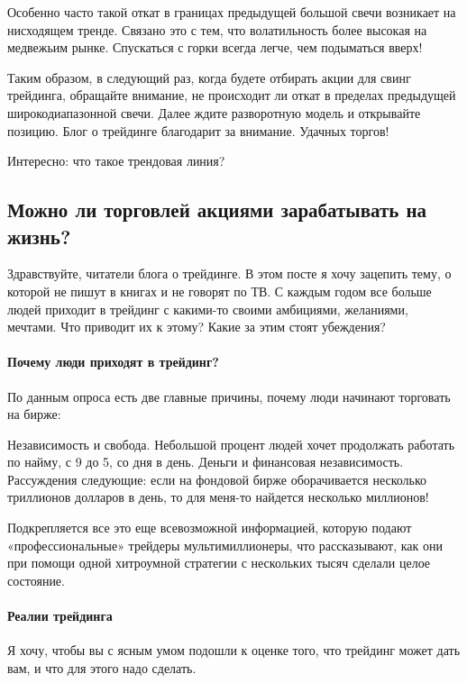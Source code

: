 \documentclass[a5paper]{article}
\begin{document}
Особенно часто такой откат в границах предыдущей большой свечи возникает на нисходящем тренде. Связано это с тем, что волатильность более высокая на медвежьим рынке. Спускаться с горки всегда легче, чем подыматься вверх!

Таким образом, в следующий раз, когда будете отбирать акции для свинг трейдинга, обращайте внимание, не происходит ли откат в пределах предыдущей широкодиапазонной свечи. Далее ждите разворотную модель и открывайте позицию. Блог о трейдинге благодарит за внимание. Удачных торгов!


Интересно: что такое трендовая линия?

\subsection{Можно ли торговлей акциями зарабатывать на жизнь?}

Здравствуйте, читатели блога о трейдинге. В этом посте я хочу зацепить
тему, о которой не пишут в книгах и не говорят по ТВ. С каждым годом
все больше людей приходит в трейдинг с какими-то своими амбициями,
желаниями, мечтами. Что приводит их к этому? Какие за этим стоят
убеждения?

\paragraph{Почему люди приходят в трейдинг?}

По данным опроса есть две главные причины, почему люди начинают торговать на бирже:

    Независимость и свобода. Небольшой процент людей хочет продолжать работать по найму, с 9 до 5, со дня в день.
    Деньги и финансовая независимость. Рассуждения следующие: если на фондовой бирже оборачивается несколько триллионов долларов в день, то для меня-то найдется несколько миллионов!

Подкрепляется все это еще всевозможной информацией, которую подают
«профессиональные» трейдеры мультимиллионеры, что рассказывают, как
они при помощи одной хитроумной стратегии с нескольких тысяч сделали
целое состояние.

\paragraph{Реалии трейдинга}

Я хочу, чтобы вы с ясным умом подошли к оценке того, что трейдинг может дать вам, и что для этого надо сделать.
\end{document}
